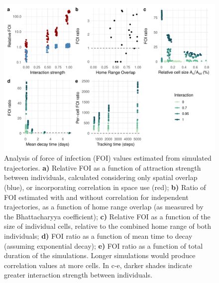 \documentclass[letterpaper]{article}
\begin{document}
\begin{figure}
    \includegraphics[width=\textwidth]{figures/sim_results.pdf}
    \caption{\small Analysis of force of infection (FOI) values estimated from simulated trajectories. \textbf{a)} Relative FOI as a function of attraction strength between individuals, calculated considering only spatial overlap (blue), or incorporating correlation in space use (red);  \textbf{b)} Ratio of FOI estimated with and without correlation for independent trajectories, as a function of home range overlap (as measured by the Bhattacharyya coefficient);   \textbf{c)} Relative FOI as a function of the size of individual cells, relative to the combined home range of both individuals; \textbf{d)} FOI ratio as a function of mean time to decay (assuming exponential decay); \textbf{e)} FOI ratio as a function of total duration of the simulations. Longer simulations would produce correlation values at more cells. In c-e, darker shades indicate greater interaction strength between individuals. }
  \label{fig:simresults}
\end{figure}
\end{document}
